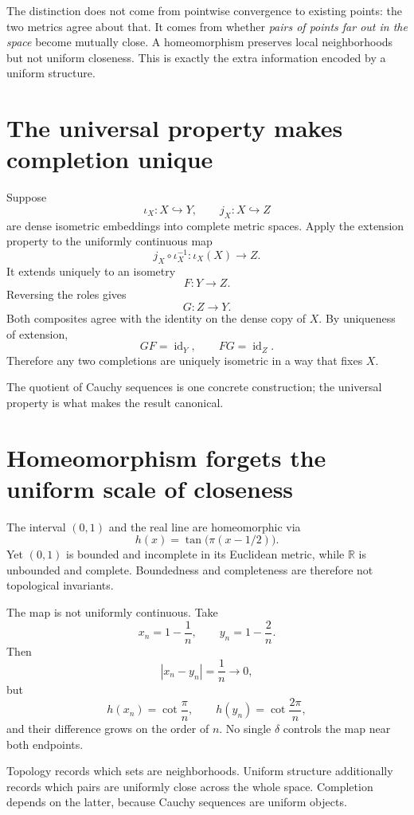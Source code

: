 The distinction does not come from pointwise convergence to existing points: the two metrics agree about that. It comes from whether \emph{pairs of points far out in the space} become mutually close. A homeomorphism preserves local neighborhoods but not uniform closeness. This is exactly the extra information encoded by a uniform structure.

\section{The universal property makes completion unique}

Suppose
\[
  \iota_X:X\hookrightarrow Y,
  \qquad
  j_X:X\hookrightarrow Z
\]
are dense isometric embeddings into complete metric spaces.  Apply the extension property to the uniformly continuous map
\[
  j_X\circ\iota_X^{-1}:\iota_X(X)\to Z.
\]
It extends uniquely to an isometry
\[
  F:Y\to Z.
\]
Reversing the roles gives
\[
  G:Z\to Y.
\]
Both composites agree with the identity on the dense copy of \(X\).  By uniqueness of extension,
\[
  GF=\operatorname{id}_Y,
  \qquad
  FG=\operatorname{id}_Z.
\]
Therefore any two completions are uniquely isometric in a way that fixes \(X\).

The quotient of Cauchy sequences is one concrete construction; the universal property is what makes the result canonical.

\section{Homeomorphism forgets the uniform scale of closeness}

The interval \((0,1)\) and the real line are homeomorphic via
\[
  h(x)=\tan\bigl(\pi(x-1/2)\bigr).
\]
Yet \((0,1)\) is bounded and incomplete in its Euclidean metric, while \(\mathbb R\) is unbounded and complete.  Boundedness and completeness are therefore not topological invariants.

The map is not uniformly continuous.  Take
\[
  x_n=1-\frac1n,
  \qquad
  y_n=1-\frac2n.
\]
Then
\[
  |x_n-y_n|=\frac1n\longrightarrow0,
\]
but
\[
  h(x_n)=\cot\frac\pi n,
  \qquad
  h(y_n)=\cot\frac{2\pi}n,
\]
and their difference grows on the order of \(n\).  No single \(\delta\) controls the map near both endpoints.

Topology records which sets are neighborhoods.  Uniform structure additionally records which pairs are uniformly close across the whole space.  Completion depends on the latter, because Cauchy sequences are uniform objects.

